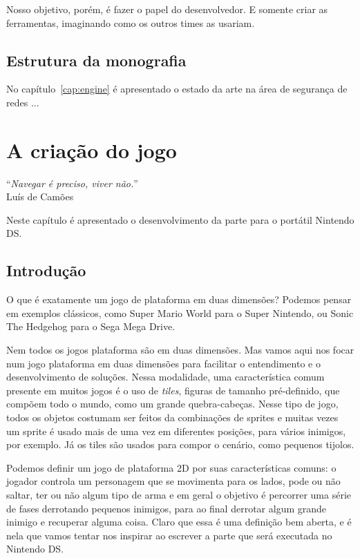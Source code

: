 \documentclass[brazil]{abnt}
\begin{document}
Nosso objetivo, porém, é fazer o papel do desenvolvedor. E somente criar as ferramentas, imaginando como os outros times as usariam.

\section{Estrutura da monografia}

No capítulo~\ref{cap:engine} é apresentado o estado da arte
na área de segurança de redes ...


\chapter{A criação do jogo\label{cap:engine}}

\vfill{}
\begin{flushright}{}``\emph{Navegar é preciso, viver não.}''\\
{\small Luís de Camões}\end{flushright}{\small \par}
\vfill{}

Neste capítulo é apresentado o desenvolvimento da parte para o portátil Nintendo DS.
\newpage


\section{Introdução}

O que é exatamente um jogo de plataforma em duas dimensões? Podemos pensar em exemplos clássicos, como Super Mario World para o Super Nintendo, ou Sonic The Hedgehog para o Sega Mega Drive.

Nem todos os jogos plataforma são em duas dimensões. Mas vamos aqui nos focar num jogo plataforma em duas dimensões para facilitar o entendimento e o desenvolvimento de soluções. Nessa modalidade, uma característica comum presente em muitos jogos é o uso de \textit{tiles}, figuras de tamanho pré-definido, que compõem todo o mundo, como um grande quebra-cabeças. Nesse tipo de jogo, todos os objetos costumam ser feitos da combinações de sprites e muitas vezes um sprite é usado mais de uma vez em diferentes posições, para vários inimigos, por exemplo. Já os tiles são usados para compor o cenário, como pequenos tijolos.

Podemos definir um jogo de plataforma 2D por suas características comuns: o jogador controla um personagem que se movimenta para os lados, pode ou não saltar, ter ou não algum tipo de arma e em geral o objetivo é percorrer uma série de fases derrotando pequenos inimigos, para ao final derrotar algum grande inimigo e recuperar alguma coisa. Claro que essa é uma definição bem aberta, e é nela que vamos tentar nos inspirar ao escrever a parte que será executada no Nintendo DS.
\end{document}
